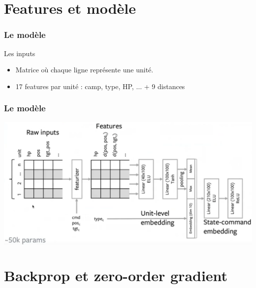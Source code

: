 \documentclass[smaller]{beamer}
\begin{document}

\section{Features et modèle}

\begin{frame}
  \frametitle{Le modèle}

  \begin{block}{Les inputs}
    \begin{itemize}
    \item Matrice où chaque ligne représente une unité.
    \item 17 features par unité : camp, type, HP, $\ldots$ + 9 distances
    \end{itemize}
  \end{block}
  
\end{frame}


\begin{frame}
  \frametitle{Le modèle}

  \centerline{\includegraphics[width=\linewidth]{./figs/model2}}  

\end{frame}


\section{Backprop et zero-order gradient}
\end{document}
